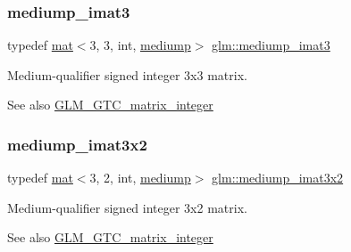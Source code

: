 \subsubsection{\texorpdfstring{mediump\+\_\+imat3}{mediump\_imat3}}
{\footnotesize\ttfamily typedef \mbox{\hyperlink{structglm_1_1mat}{mat}}$<$3, 3, int, \mbox{\hyperlink{namespaceglm_a36ed105b07c7746804d7fdc7cc90ff25a6416f3ea0c9025fb21ed50c4d6620482}{mediump}}$>$ \mbox{\hyperlink{group__gtc__matrix__integer_gac6ab7a5cfe157ba8deb79a7691ad8263}{glm\+::mediump\+\_\+imat3}}}

Medium-\/qualifier signed integer 3x3 matrix. \begin{DoxySeeAlso}{See also}
\mbox{\hyperlink{group__gtc__matrix__integer}{G\+L\+M\+\_\+\+G\+T\+C\+\_\+matrix\+\_\+integer}} 
\end{DoxySeeAlso}
\mbox{\label{group__gtc__matrix__integer_gae3f0a14fb81eb2edc0caf5b131adb969}} 
\subsubsection{\texorpdfstring{mediump\+\_\+imat3x2}{mediump\_imat3x2}}
{\footnotesize\ttfamily typedef \mbox{\hyperlink{structglm_1_1mat}{mat}}$<$3, 2, int, \mbox{\hyperlink{namespaceglm_a36ed105b07c7746804d7fdc7cc90ff25a6416f3ea0c9025fb21ed50c4d6620482}{mediump}}$>$ \mbox{\hyperlink{group__gtc__matrix__integer_gae3f0a14fb81eb2edc0caf5b131adb969}{glm\+::mediump\+\_\+imat3x2}}}

Medium-\/qualifier signed integer 3x2 matrix. \begin{DoxySeeAlso}{See also}
\mbox{\hyperlink{group__gtc__matrix__integer}{G\+L\+M\+\_\+\+G\+T\+C\+\_\+matrix\+\_\+integer}} 
\end{DoxySeeAlso}
\mbox{\label{group__gtc__matrix__integer_ga1304a2da9c3f5937aa8c4684d638d09c}} 
